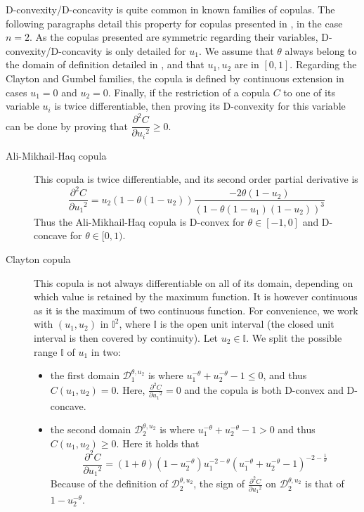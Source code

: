 D-convexity/D-concavity is quite common in known families of copulas. The following paragraphs detail this property for copulas presented in , in the case $n=2$.
As the copulas presented are symmetric regarding their variables, D-convexity/D-concavity is only detailed for $u_1$. We assume that \( \theta \) always belong to the domain of definition detailed in , and that \(u_1, u_2\) are in \([0, 1]\). Regarding the Clayton and Gumbel families, the copula is defined by continuous extension in cases $u_1=0$ and $u_2=0$. Finally, if the restriction of a copula $C$ to one of its variable $u_i$ is twice differentiable, then proving its D-convexity for this variable can be done by proving that $\dfrac{\partial^2 C}{\partial {u_i}^2}\geqslant 0$.
\begin{description}
    \item[Ali-Mikhail-Haq copula] This copula is twice differentiable, and its second order partial derivative is
    $$\frac{\partial^2 C}{\partial {u_1}^2}=u_2(1-\theta(1-u_2))\frac{-2\theta(1-u_2)}{(1-\theta(1-u_1)(1-u_2))^3}$$
    Thus the Ali-Mikhail-Haq copula is D-convex for $\theta\in[-1,0]$ and D-concave for $\theta\in[0,1)$.
    \item[Clayton copula] This copula is not always differentiable on all of its domain, depending on which value is retained by the maximum function. It is however continuous as it is the maximum of two continuous function. For convenience, we work with $(u_1, u_2)$ in $\mathbb{I}^2$, where $\mathbb{I}$ is the open unit interval (the closed unit interval is then covered by continuity). Let $u_2\in\mathbb{I}$. We split the possible range $\mathbb{I}$ of $u_1$ in two:
\begin{itemize}
    \item the first domain $\mathcal{D}_1^{\theta,u_2}$ is where $u_1^{-\theta}+u_2^{-\theta}-1\leqslant0$, and thus $C(u_1, u_2)=0$. Here, $\frac{\partial^2 C}{\partial {u_1}^2}=0$ and the copula is both D-convex and D-concave.
    \item the second domain $\mathcal{D}_2^{\theta,u_2}$ is where $u_1^{-\theta}+u_2^{-\theta}-1>0$ and thus $C(u_1, u_2)\geqslant0$. Here it holds that
    $$\frac{\partial^2 C}{\partial {u_1}^2}=(1+\theta)(1-u_2^{-\theta})u_1^{-2-\theta}(u_1^{-\theta}+u_2^{-\theta}-1)^{-2-\frac{1}{\theta}}$$
    Because of the definition of $\mathcal{D}_2^{\theta,u_2}$, the sign of $\frac{\partial^2 C}{\partial {u_1}^2}$ on $\mathcal{D}_2^{\theta,u_2}$ is that of $1-u_2^{-\theta}$.
\end{itemize}


\end{description}
